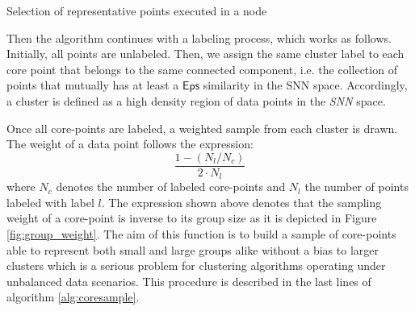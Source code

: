 \documentclass[smallextended]{svjour3}       %
\begin{document}
\begin{algorithm}[!htbp]
 \DontPrintSemicolon
  
\caption{Selection of representative points executed in a node}
 \label{alg:coresample}
\end{algorithm}
\fi


Then the algorithm continues with a labeling process, which works as follows. Initially, all points are unlabeled. Then, we assign the same cluster label to each core point that belongs to the same connected component, i.e. the collection of points that mutually has at least a $\mathsf{Eps}$ similarity in the SNN space. Accordingly, a cluster is defined as a high density region of data points in the \textit{SNN} space. 

Once all core-points are labeled, a weighted sample from each cluster is drawn. The weight of a data point follows the expression:\[\dfrac{1 - ( N_l/N_c ) }{2\cdot N_l}\] where $N_c$ denotes the number of labeled core-points and $N_l$ the number of points labeled with label $l$. The expression shown above denotes that the sampling weight of a core-point is inverse to its group size as it is depicted in Figure \ref{fig:group_weight}. The aim of this function is to build a sample of core-points able to represent both small and large groups alike without a bias to larger clusters which is a serious problem for clustering algorithms operating under unbalanced data scenarios.
This procedure is described in the last lines of algorithm \ref{alg:coresample}. 
\end{document}
